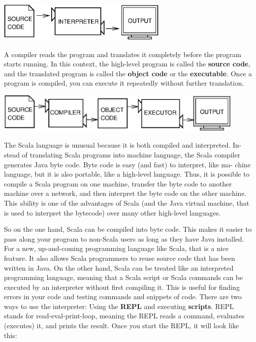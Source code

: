 \documentclass[10pt]{book}
\begin{document}
\beforefig
\centerline{\includegraphics[height=0.77in]{figs/interpret.eps}}
\afterfig


A compiler reads the program and translates it completely before the program 
starts running.  In this context, the high-level program is called the {\bf source 
code}, and the translated program is called the {\bf object code} or the {\bf executable}.  
Once a program is compiled, you can execute it repeatedly without further translation.

\beforefig
\centerline{\includegraphics[height=0.77in]{figs/compile.eps}}
\afterfig

The Scala language is unusual because it is both compiled and interpreted. In-
stead of translating Scala programs into machine language, the Scala compiler
generates Java byte code. Byte code is easy (and fast) to interpret, like ma-
chine language, but it is also portable, like a high-level language. Thus, it is
possible to compile a Scala program on one machine, transfer the byte code to
another machine over a network, and then interpret the byte code on the other
machine. This ability is one of the advantages of Scala (and the Java virtual machine,
that is used to interpret the bytecode) over many other high-level
languages.

So on the one hand, Scala can be compiled into byte code. This makes it easier to pass
 along your
program to non-Scala users as long as they have Java installed. For a new, 
up-and-coming programming language like Scala, that is a nice feature. It also allows
Scala programmers to reuse source code that has been written in Java. On the other hand, 
Scala can be treated like an interpreted programming language, meaning that a Scala 
script or Scala commands can be executed by an interpreter without first compiling it.
 This is useful for finding 
errors in your code and testing commands and snippets of code. There are two ways to use 
the interpreter: Using the {\bf REPL} and executing {\bf scripts}. REPL stands for
read-eval-print-loop, meaning the REPL reads a command, evaluates (executes) it, and
prints the result. Once you start the REPL, it will look like this:
\end{document}

